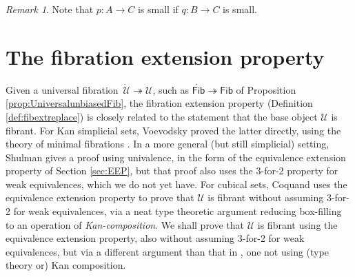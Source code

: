 \documentclass[11pt]{amsart}
\newcommand{\ra}{\ensuremath{\rightarrow}}
\newcommand{\fib}{\ensuremath{\twoheadrightarrow}}
\newcommand{\U}{\ensuremath{\mathcal{U}}}
\newcommand{\UU}{\ensuremath{\,\dot{\mathcal{U}}}}
\newcommand{\Fib}{\ensuremath{\mathsf{Fib}}}
\newcommand{\FFib}{\ensuremath{\dot{\mathsf{Fib}}}}
\theoremstyle{remark}
\newtheorem{remark}[theorem]{Remark}
\theoremstyle{definition}
\begin{document}
\begin{remark}
Note that $p : A \ra C$ is small if $q : B\ra C$ is small.
\end{remark}

\section{The fibration extension property}\label{sec:FEP}

Given a universal fibration $\UU\fib\U$, such as $\FFib\fib\Fib$ of Proposition \ref{prop:UniversalunbiasedFib}, the fibration extension property (Definition \ref{def:fibextreplace}) is closely related to the statement that the base object $\U$ is fibrant.  For Kan simplicial sets, Voevodsky proved the latter directly, using the theory of minimal fibrations \cite{VVuniverse}.   In a more general (but still simplicial) setting, Shulman \cite{Shulmanuniverse} gives a proof using univalence, in the form of the equivalence extension property of Section \ref{sec:EEP}, but that proof also uses the 3-for-2 property for weak equivalences, which we do not yet have. For cubical sets, Coquand \cite{CCHM} uses the equivalence extension property to prove that $\U$ is fibrant without assuming 3-for-2 for weak equivalences, via a neat type theoretic argument reducing box-filling to an operation of \emph{Kan-composition}.   We shall prove that $\U$ is fibrant using the equivalence extension property, also without assuming 3-for-2 for weak equivalences, but via a different argument than that in \cite{CCHM}, one not using (type theory or)  Kan composition.
\end{document}
